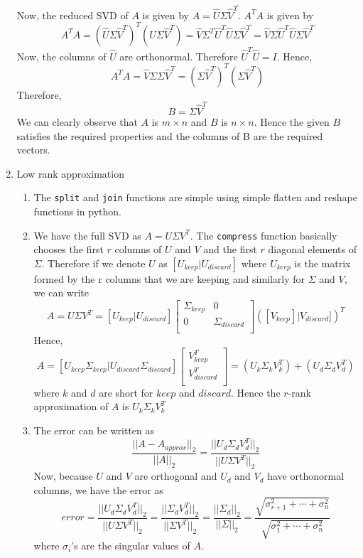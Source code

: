 \documentclass{article}
\begin{document}
\begin{enumerate}
    Now, the reduced SVD of $A$ is given by $A = \hat{U}\Sigma\hat{V}^T$. $A^TA$ is given by
    $$A^TA = (\hat{U}\Sigma\hat{V}^T)^T(\hat{U}\Sigma\hat{V}^T) = \hat{V}\Sigma^T\hat{U}^T\hat{U}\Sigma\hat{V}^T = \hat{V}\Sigma\hat{U}^T\hat{U}\Sigma\hat{V}^T$$
    Now, the columns of $\hat{U}$ are orthonormal. Therefore $\hat{U}^T\hat{U} = I$. Hence,
    $$A^TA = \hat{V}\Sigma\Sigma\hat{V}^T = (\Sigma\hat{V}^T)^T(\Sigma\hat{V}^T)$$
    Therefore,
    $$B = \Sigma\hat{V}^T$$
    We can clearly observe that $A$ is $m \times n$ and $B$ is $n \times n$. Hence the given $B$ satisfies the required properties and the columns of B are the required vectors.
    \item Low rank approximation
    \begin{enumerate}[label=(\alph*)]
        \item The \texttt{split} and \texttt{join} functions are simple using simple flatten and reshape functions in python.
        \item We have the full SVD as $A = U\Sigma V^T$. The \texttt{compress} function basically chooses the first $r$ columns of $U$ and $V$ and the first $r$ diagonal elements of $\Sigma$. Therefore if we denote $U$ as $[U_{keep} | U_{discard}]$ where $U_{keep}$ is the matrix formed by the r columns that we are keeping and similarly for $\Sigma$ and $V$, we can write
        $$A = U\Sigma V^T = [U_{keep} | U_{discard}] \begin{bmatrix}
            \Sigma_{keep} & 0\\
            0 & \Sigma_{discard}\\
        \end{bmatrix} ([V_{keep}] | V_{discard}])^T$$
        Hence,
        $$A = [U_{keep}\Sigma_{keep} | U_{discard}\Sigma_{discard}]\begin{bmatrix}
            V_{keep}^T\\
            V_{discard}^T\\
        \end{bmatrix} = (U_k\Sigma_kV_k^T) + (U_d\Sigma_dV_d^T)$$
        where $k$ and $d$ are short for $keep$ and $discard$.
        Hence the $r$-rank approximation of $A$ is $U_k\Sigma_kV_k^T$
        \item The error can be written as
        $$\frac{||A - A_{approx}||_2}{||A||_2} = \frac{||U_d\Sigma_dV_d^T||_2}{||U\Sigma V^T||_2}$$
        Now, because $U$ and $V$ are orthogonal and $U_d$ and $V_d$ have orthonormal columns, we have the error as
        $$error = \frac{||U_d\Sigma_dV_d^T||_2}{||U\Sigma V^T||_2} = \frac{||\Sigma_dV_d^T||_2}{||\Sigma V^T||_2} = \frac{||\Sigma_d||_2}{||\Sigma||_2} = \frac{\sqrt{\sigma_{r+1}^2 + \cdots + \sigma_n^2}}{\sqrt{\sigma_1^2 + \cdots + \sigma_n^2}}$$
        where $\sigma_i$'s are the singular values of $A$.
    \end{enumerate}
\end{enumerate}
\end{document}
